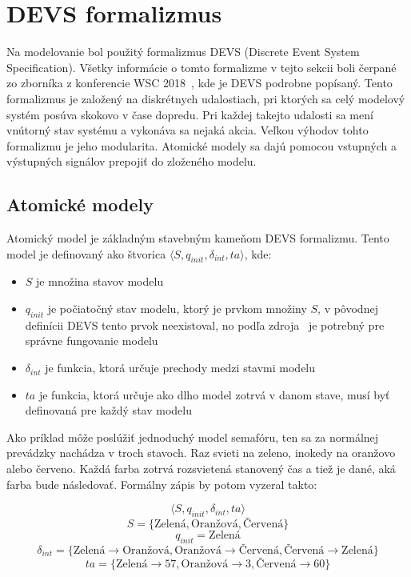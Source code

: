 \section{DEVS formalizmus}
Na modelovanie bol použitý formalizmus DEVS (Discrete Event System Specification).
Všetky informácie o tomto formalizme v tejto sekcii boli čerpané zo zborníka z konferencie WSC 2018~\cite{tendeloo2018discrete}, kde je DEVS podrobne popísaný.
Tento formalizmus je založený na diskrétnych udalostiach, pri ktorých sa celý modelový systém posúva skokovo v čase dopredu.
Pri každej takejto udalosti sa mení vnútorný stav systému a vykonáva sa nejaká akcia.
Veľkou výhodov tohto formalizmu je jeho modularita.
Atomické modely sa dajú pomocou vstupných a výstupných signálov prepojiť do zloženého modelu.

\subsection*{Atomické modely}
Atomický model je základným stavebným kameňom DEVS formalizmu.
Tento model je definovaný ako štvorica $\langle S, q_{init}, {\delta}_{int}, ta \rangle$, kde:
\begin{itemize}
  \item $S$ je množina stavov modelu
  \item $q_{init}$ je počiatočný stav modelu, ktorý je prvkom množiny $S$, v pôvodnej definícii DEVS tento prvok neexistoval, no podľa zdroja~\cite{tendeloo2018discrete} je potrebný pre správne fungovanie modelu
  \item ${\delta}_{int}$ je funkcia, ktorá určuje prechody medzi stavmi modelu
  \item $ta$ je funkcia, ktorá určuje ako dlho model zotrvá v danom stave, musí byť definovaná pre každý stav modelu
\end{itemize}

Ako príklad môže poslúžiť jednoduchý model semafóru, ten sa za normálnej prevádzky nachádza v troch stavoch.
Raz svieti na zeleno, inokedy na oranžovo alebo červeno.
Každá farba zotrvá rozsvietená stanovený čas a tiež je dané, aká farba bude následovať.
Formálny zápis by potom vyzeral takto:

\[\langle S, q_{init}, \delta_{int}, ta \rangle\]
\[S = \{\text{Zelená}, \text{Oranžová}, \text{Červená} \}\]
\[q_{init} = \text{Zelená}\]
\[\delta_{int} = \{ \text{Zelená} \rightarrow \text{Oranžová}, \text{Oranžová} \rightarrow \text{Červená}, \text{Červená} \rightarrow \text{Zelená} \}\]
\[ta = \{ \text{Zelená} \rightarrow 57, \text{Oranžová} \rightarrow 3, \text{Červená} \rightarrow 60 \}\]

